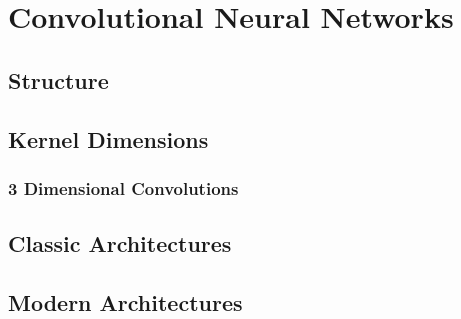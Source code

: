 
\chapter{Convolutional Neural Networks} %

\label{Chapter2} %

\section{Structure}

\section{Kernel Dimensions}

\subsection{3 Dimensional Convolutions}

\section{Classic Architectures}

\section{Modern Architectures}